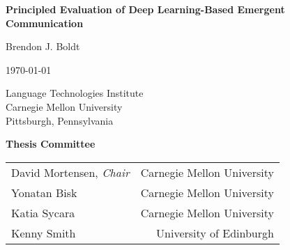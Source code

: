 \thispagestyle{title}
\begin{centering}
\textbf{\LARGE Principled Evaluation of Deep Learning-Based Emergent Communication}

\vspace{3pc}
{\large Brendon J. Boldt}

\vspace{2pc}
\today{}

\vfill

Language Technologies Institute \\
Carnegie Mellon University \\
Pittsburgh, Pennsylvania

\vspace{4pc}

\textbf{Thesis Committee}
\vspace{0.5pc}

\begin{tabular}{lr}
  David Mortensen, \emph{Chair} & Carnegie Mellon University \\
  Yonatan Bisk & Carnegie Mellon University \\
  Katia Sycara & Carnegie Mellon University \\
  Kenny Smith & University of Edinburgh
\end{tabular}

\end{centering}
